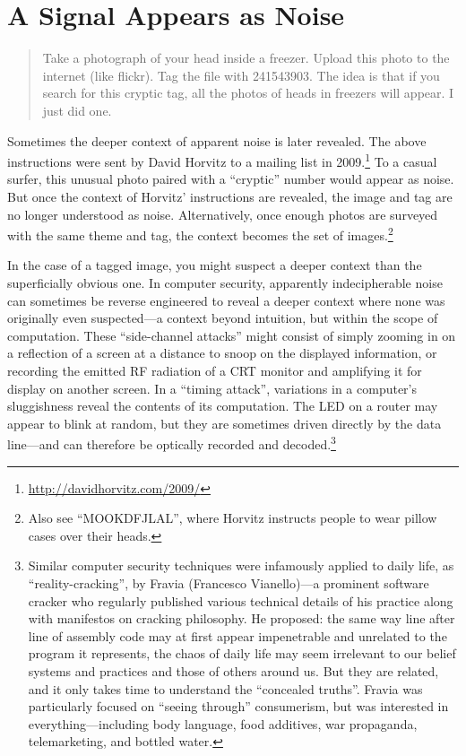 \documentclass{thesis}
\begin{document}
\section{A Signal Appears as Noise}

\begin{quote}
Take a photograph of your head inside a freezer. Upload this photo to the internet (like flickr). Tag the file with 241543903. The idea is that if you search for this cryptic tag, all the photos of heads in freezers will appear. I just did one.\cite{david_horvitz_flickr:_????-1}
\end{quote}

Sometimes the deeper context of apparent noise is later revealed. The above instructions were sent by David Horvitz to a mailing list in 2009.\footnote{\url{http://davidhorvitz.com/2009/}} To a casual surfer, this unusual photo paired with a ``cryptic'' number would appear as noise. But once the context of Horvitz' instructions are revealed, the image and tag are no longer understood as noise. Alternatively, once enough photos are surveyed with the same theme and tag, the context becomes the set of images.\footnote{Also see ``MOOKDFJLAL''\cite{david_horvitz_flickr:_????}, where Horvitz instructs people to wear pillow cases over their heads.}

In the case of a tagged image, you might suspect a deeper context than the superficially obvious one. In computer security, apparently indecipherable noise can sometimes be reverse engineered to reveal a deeper context where none was originally even suspected---a context beyond intuition, but within the scope of computation. These ``side-channel attacks'' might consist of simply zooming in on a reflection of a screen at a distance to snoop on the displayed information,\cite{w._wayt_gibbs_hackers_2009} or recording the emitted RF radiation of a CRT monitor and amplifying it for display on another screen.\cite{erik_thiele_tempest_????} In a ``timing attack'', variations in a computer's sluggishness reveal the contents of its computation. The LED on a router may appear to blink at random, but they are sometimes driven directly by the data line---and can therefore be optically recorded and decoded.\footnote{Similar computer security techniques were infamously applied to daily life, as ``reality-cracking''\cite{francesco_vianello_reality_????}, by Fravia (Francesco Vianello)---a prominent software cracker who regularly published various technical details of his practice along with manifestos on cracking philosophy. He proposed: the same way line after line of assembly code may at first appear impenetrable and unrelated to the program it represents, the chaos of daily life may seem irrelevant to our belief systems and practices and those of others around us. But they are related, and it only takes time to understand the ``concealed truths''. Fravia was particularly focused on ``seeing through'' consumerism, but was interested in everything---including body language, food additives, war propaganda, telemarketing, and bottled water.}
\end{document}
